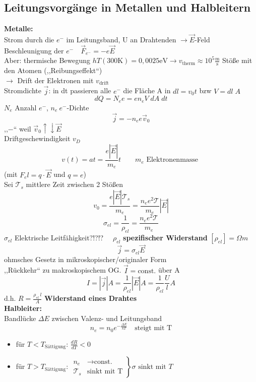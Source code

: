 \documentclass[titlepage,12pt,a4paper,ngerman]{report}
\newcommand{\tx}[1]{\textrm{#1}}
\begin{document}
\subsection{Leitungsvorgänge in Metallen und Halbleitern}
\textbf{Metalle:} \\
Strom durch die $ e^- $ im Leitungsband, U an Drahtenden $ \rightarrow  \vec{E}$-Feld\\
Beschleunigung der $ e^- \quad \vec{F}_{e^-} = - e \vec{E}$\\
Aber: thermische Bewegung $hT(300\tx{K})= 0,0025 \tx{eV} \rightarrow v_{\tx{therm}} \approx 10^5 \frac{\tx{m}}{\tx{s}}$
Stöße mit den Atomen (,,Reibungseffekt``)\\
$\rightarrow$ Drift der Elektronen mit $ v_{\tx{drift}} $\\[5pt]
Stromdichte $ \vec{j} $: in dt passieren alle $ e^- $ die Fläche A in $dl = v_0 t$ bzw $ V = dl\;A $\\
$$dQ = N_e e = e n_e V \;dA\;dt$$ 
$N_e$ Anzahl $e^-$, $n_e \ e^- $-Dichte\\
$$\boxed{\vec{j} = - n_e e \vec{v}_0}$$ ,,$-$`` weil $ \vec{v}_0 \uparrow \downarrow \vec{E} $\\
Driftgeschewindigkeit $v_D$ 
$$v(t) = a t = \frac{e|\vec{E}|}{m_e} t \qquad m_e \tx{ Elektronenmasse }$$
(mit $ F_el = q \cdot \vec{E} $ und $ q = e $)\\
Sei $ \mathcal{T}_s $ mittlere Zeit zwischen 2 Stößen
$$v_0 = \frac{e|\vec{E}| \mathcal{T}_s}{m_e} = \boxed{\frac{n_e e^2 \mathcal{T}}{m_e}} |\vec{E}|$$
$$\boxed{\sigma_{el} = \frac{1}{\rho_{el}} = \frac{n_e e^2 \mathcal{T}}{m_e}}$$
$ \sigma_{el} $ Elektrische Leitfähigkeit?!?!? $\quad \rho_{el} $ \textbf{spezifischer Widerstand} $ [\rho_{el} ] = \Omega m $
$$\boxed{\vec{j} = \sigma_{el} \vec{E}}$$
ohmsches Gesetz in mikroskopischer/originaler Form\\
,,Rückkehr`` zu makroskopischem OG. $ \vec{I} = \tx{const.} $ über A
$$I = |\vec{j}| A = \frac{1}{\rho_{el}} |\vec{E}| A = \frac{1}{\rho_{el}} \frac{U}{l} A$$
d.h. $\boxed{ R = \frac{\rho_{el}\ l}{A}}$ \textbf{Widerstand eines Drahtes}\\
\textbf{Halbleiter:}\\
Bandlücke $ \Delta E $ zwischen Valenz- und Leitungsband 
$$n_e = n_0 e^{-\frac{\Delta E}{k T}} \quad \tx{steigt mit T}$$
\begin{itemize}
	\item für $ T<T_{\tx{Sättigung}} $: $ \frac{dR}{dT} <0$
	\item für $ T>T_{\tx{Sättigung}} $: $ \left. \begin{array}{ll}
	n_e & \rightarrow \tx{const.} \\ \mathcal{T}_s & \tx{sinkt mit T}
	\end{array} \right\}  
	\sigma \tx{ sinkt mit } T$
\end{itemize}
\end{document}
